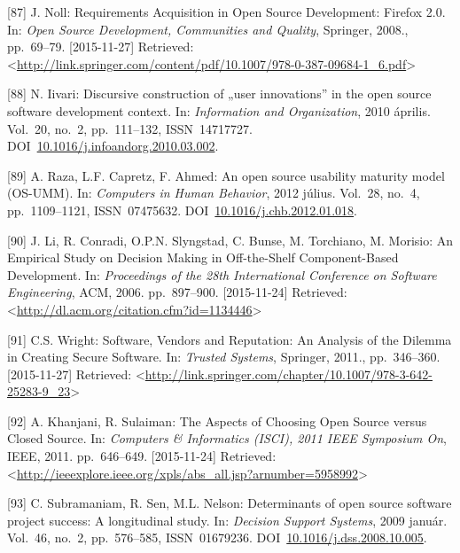 \documentclass[12pt,magyar,a4paper,oneside]{scrreprt}
\newenvironment{cslreferences}%
  {}%
  {\par}
\begin{document}
\begin{cslreferences}
\leavevmode\hypertarget{ref-noll_requirements_2008}{}%
{[}87{]} J. Noll: Requirements Acquisition in Open Source Development:
Firefox 2.0. In: \emph{Open Source Development, Communities and
Quality}, Springer, 2008., pp.~69--79. {[}2015-11-27{]} Retrieved:
\textless{}\url{http://link.springer.com/content/pdf/10.1007/978-0-387-09684-1_6.pdf}\textgreater{}

\leavevmode\hypertarget{ref-iivari_discursive_2010}{}%
{[}88{]} N. Iivari: Discursive construction of „user innovations'' in
the open source software development context. In: \emph{Information and
Organization}, 2010 április. Vol.~20, no.~2, pp.~111--132,
ISSN~14717727.
DOI~\href{https://doi.org/10.1016/j.infoandorg.2010.03.002}{10.1016/j.infoandorg.2010.03.002}.

\leavevmode\hypertarget{ref-raza_open_2012}{}%
{[}89{]} A. Raza, L.F. Capretz, F. Ahmed: An open source usability
maturity model (OS-UMM). In: \emph{Computers in Human Behavior}, 2012
július. Vol.~28, no.~4, pp.~1109--1121, ISSN~07475632.
DOI~\href{https://doi.org/10.1016/j.chb.2012.01.018}{10.1016/j.chb.2012.01.018}.

\leavevmode\hypertarget{ref-li_empirical_2006}{}%
{[}90{]} J. Li, R. Conradi, O.P.N. Slyngstad, C. Bunse, M. Torchiano, M.
Morisio: An Empirical Study on Decision Making in Off-the-Shelf
Component-Based Development. In: \emph{Proceedings of the 28th
International Conference on Software Engineering}, ACM, 2006.
pp.~897--900. {[}2015-11-24{]} Retrieved:
\textless{}\url{http://dl.acm.org/citation.cfm?id=1134446}\textgreater{}

\leavevmode\hypertarget{ref-wright_software_2011}{}%
{[}91{]} C.S. Wright: Software, Vendors and Reputation: An Analysis of
the Dilemma in Creating Secure Software. In: \emph{Trusted Systems},
Springer, 2011., pp.~346--360. {[}2015-11-27{]} Retrieved:
\textless{}\url{http://link.springer.com/chapter/10.1007/978-3-642-25283-9_23}\textgreater{}

\leavevmode\hypertarget{ref-khanjani_aspects_2011}{}%
{[}92{]} A. Khanjani, R. Sulaiman: The Aspects of Choosing Open Source
versus Closed Source. In: \emph{Computers \& Informatics (ISCI), 2011
IEEE Symposium On}, IEEE, 2011. pp.~646--649. {[}2015-11-24{]}
Retrieved:
\textless{}\url{http://ieeexplore.ieee.org/xpls/abs_all.jsp?arnumber=5958992}\textgreater{}

\leavevmode\hypertarget{ref-subramaniam_determinants_2009}{}%
{[}93{]} C. Subramaniam, R. Sen, M.L. Nelson: Determinants of open
source software project success: A longitudinal study. In:
\emph{Decision Support Systems}, 2009 január. Vol.~46, no.~2,
pp.~576--585, ISSN~01679236.
DOI~\href{https://doi.org/10.1016/j.dss.2008.10.005}{10.1016/j.dss.2008.10.005}.


\end{cslreferences}
\end{document}
